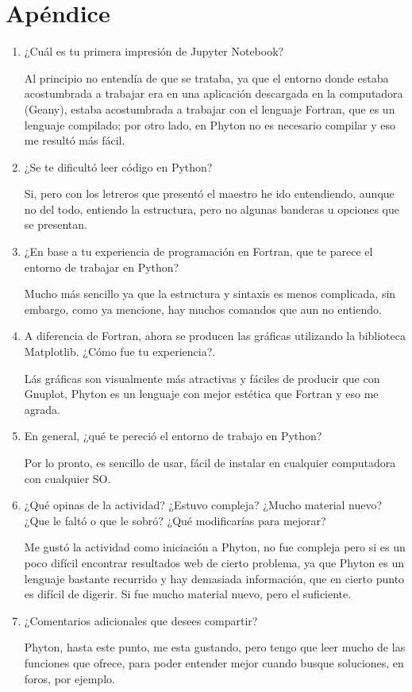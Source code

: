 \documentclass[a4paper]{article}
\begin{document}
\section{Apéndice}
\begin{enumerate}
\item ¿Cuál es tu primera impresión de Jupyter Notebook?

Al principio no entendía de que se trataba, ya que el entorno donde estaba acostumbrada a trabajar era en una aplicación descargada en la computadora (Geany), estaba acostumbrada a trabajar con el lenguaje Fortran, que es un lenguaje compilado; por otro lado, en Phyton no es necesario compilar y eso me resultó más fácil.

\item ¿Se te dificultó leer código en Python?

Si, pero con los letreros que presentó el maestro he ido entendiendo, aunque no del todo, entiendo la estructura, pero no algunas banderas u opciones que se presentan. 

\item ¿En base a tu experiencia de programación en Fortran, que te parece el entorno de trabajar en Python?

Mucho más sencillo ya que la estructura y sintaxis es menos complicada, sin embargo, como ya mencione, hay muchos comandos que aun no entiendo. 

\item A diferencia de Fortran, ahora se producen las gráficas utilizando la biblioteca Matplotlib. ¿Cómo fue tu experiencia?. 

Lás gráficas son visualmente más atractivas y fáciles de producir que con Gnuplot, Phyton es un lenguaje con mejor estética que Fortran y eso me agrada.

\item En general, ¿qué te pereció el entorno de trabajo en Python? 

Por lo pronto, es sencillo de usar, fácil de instalar en cualquier computadora con cualquier SO. 

\item ¿Qué opinas de la actividad? ¿Estuvo compleja? ¿Mucho material nuevo? ¿Que le faltó o que le sobró? ¿Qué modificarías para mejorar? 

Me gustó la actividad como iniciación a Phyton, no fue compleja pero si es un poco difícil encontrar resultados web de cierto problema, ya que Phyton es un lenguaje bastante recurrido y hay demasiada información, que en cierto punto es difícil de digerir. Si fue mucho material nuevo, pero el suficiente. 

\item ¿Comentarios adicionales que desees compartir? 

Phyton, hasta este punto, me esta gustando, pero tengo que leer mucho de las funciones que ofrece, para poder entender mejor cuando busque soluciones, en foros, por ejemplo.
\end{enumerate}
\end{document}

